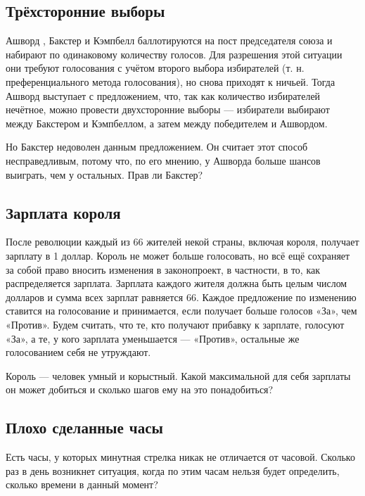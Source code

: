 \subsection*{Трёхсторонние выборы}%


Ашворд%
, Бакстер и Кэмпбелл баллотируются на пост председателя  союза %
и набирают  по одинаковому количеству голосов. Для разрешения этой ситуации они требуют голосования с учётом второго выбора избирателей (т. н. преференциального метода голосования), но снова приходят к ничьей.  Тогда Ашворд выступает с предложением, что, так как количество избирателей нечётное,  можно провести двухсторонние выборы  --- избиратели выбирают между  Бакстером и Кэмпбеллом, а затем между победителем и Ашвордом.


Но Бакстер недоволен данным предложением. Он считает этот способ несправедливым, потому что, по его мнению, у Ашворда  больше шансов выиграть, чем у остальных. Прав ли Бакстер?


\subsection*{Зарплата короля}%


После революции каждый из 66 жителей некой страны, включая короля, получает зарплату в 1 доллар.
Король не может больше голосовать,  но  всё ещё сохраняет за собой право вносить изменения в законопроект,  в частности,  в то,  как распределяется зарплата.
Зарплата каждого жителя должна быть целым числом долларов и сумма всех зарплат  равняется 66.
Каждое предложение по изменению ставится на голосование и принимается, если получает больше голосов «За», чем «Против».
Будем считать, что те, кто получают прибавку к зарплате, голосуют «За», а те, у кого зарплата уменьшается --- «Против»,  остальные же голосованием себя не утруждают.


Король --- человек умный и корыстный. Какой  максимальной для себя зарплаты он может добиться и сколько шагов ему на это понадобиться?%




\subsection*{Плохо сделанные часы}%


Есть часы, у которых минутная стрелка никак не отличается от часовой. Сколько раз в день возникнет ситуация, когда  по этим часам нельзя будет определить, сколько времени в данный момент?


